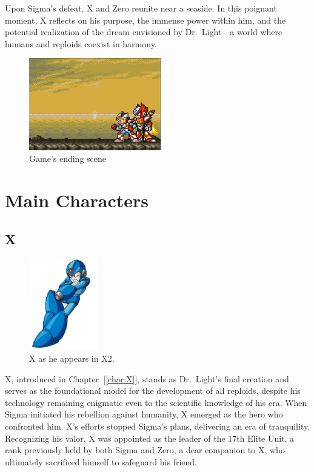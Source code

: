 Upon Sigma's defeat, X and Zero reunite near a seaside. In this poignant moment, X reflects on his purpose, the immense power within him, and the potential realization of the dream envisioned by Dr.~Light—a world where humans and reploids coexist in harmony.

\begin{figure}[htp]
	\centering
	\includegraphics[height=4cm]{figures/X2/Ending.jpg}
	\caption{Game's ending scene}
\end{figure}
\section{Main Characters}

\subsection{X}

\begin{figure}[htp]
	\centering
	\includegraphics[height=4cm]{figures/X2/X.png}
	\caption{X as he appears in X2.}
\end{figure}

X, introduced in Chapter~[\ref{char:X}], stands as Dr.~Light's final creation and serves as the foundational model for the development of all reploids, despite his technology remaining enigmatic even to the scientific knowledge of his era. When Sigma initiated his rebellion against humanity, X emerged as the hero who confronted him. X's efforts stopped Sigma's plans, delivering an era of tranquility. Recognizing his valor, X was appointed as the leader of the 17th Elite Unit, a rank previously held by both Sigma and Zero, a dear companion to X, who ultimately sacrificed himself to safeguard his friend.

